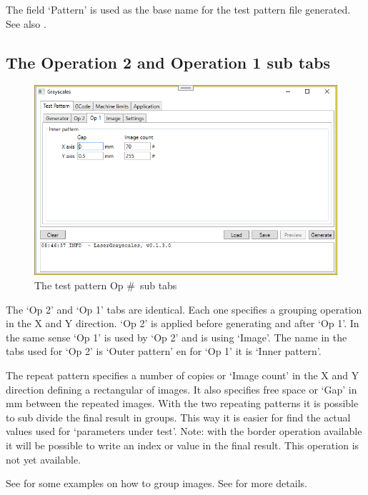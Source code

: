 The field `Pattern' is used as the base name for the test pattern file generated. See also .

\subsection{The Operation 2 and Operation 1 sub tabs}\label{TestPatternOpTab}
\begin{figure}[h!]
    \centering
    \includegraphics[width=0.8\linewidth]{./images/Operation1.png}
    \caption{The test pattern Op \#\ sub tabs}
\end{figure}

The `Op 2' and `Op 1' tabs are identical. Each one specifies a grouping operation in the X and Y direction. `Op 2' is applied before generating and after `Op 1'.
In the same sense `Op 1' is used by `Op 2' and is using `Image'. The name in the tabs used for `Op 2'  is `Outer pattern' en for `Op 1' it is `Inner pattern'.

The repeat pattern specifies a number of copies or `Image count' in the X and Y direction defining a rectangular of images. It also specifies free space or `Gap' in mm
between the repeated images. With the two repeating patterns it is possible to sub divide the final result in groups. This way it is easier for find the actual values
used for `parameters under test'. Note: with the border operation available it will be possible to write an index or value in the final result. This operation is
not yet available.

See  for some examples on how to group images. See  for more details.

